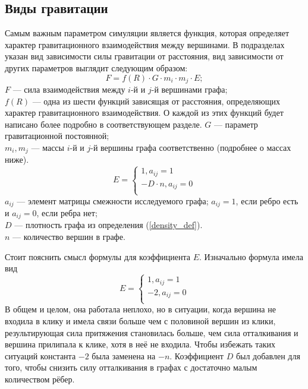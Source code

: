   \subsection{Виды гравитации}
    Самым важным параметром симуляции является функция, которая определяет
    характер гравитационного взаимодействия между вершинами.
    В подразделах указан вид зависимости силы гравитации от расстояния, вид
    зависимости от других параметров выглядит следующим образом:
    \begin{equation}
      F = f\left( R \right) \cdot  G \cdot m_i \cdot m_j \cdot E;
    \end{equation}
    $F$ --- сила взаимодействия между $i$-й и $j$-й вершинами графа;\\
    $f\left( R \right)$ --- одна из шести функций зависящая от расстояния,
    определяющих характер гравитационного взаимодействия. О каждой из этих функций
    будет написано более подробно в соответствующем разделе. 
    $G$ --- параметр гравитационной постоянной;\\
    $m_i, m_j$ --- массы $i$-й и $j$-й вершины графа соответственно (подробнее о
    массах ниже).\\
    \begin{equation}
      E =
      \begin{cases}
        1, a_{ij} = 1 \\
        - D \cdot n, a_{ij} = 0 \\
      \end{cases}
    \end{equation}
    $a_{ij}$ --- элемент матрицы смежности исследуемого графа;
    $a_{ij} = 1$, если ребро есть и $a_{ij} = 0$, если ребра нет;\\
    $D$ --- плотность графа из определения (\ref{density_def}).\\
    $n$ --- количество вершин в графе.

    Стоит пояснить смысл формулы для коэффициента $E$.
    Изначально формула имела вид
    \begin{equation}
      E =
      \begin{cases}
        1, a_{ij} = 1 \\
        - 2, a_{ij} = 0 \\
      \end{cases}
    \end{equation}
    В общем и целом, она работала неплохо, но в ситуации, когда вершина не входила
    в клику и имела связи больше чем с половиной вершин из клики, результирующая
    сила притяжения становилась больше, чем сила отталкивания и вершина прилипала
    к клике, хотя в неё не входила.
    Чтобы избежать таких ситуаций константа $-2$ была заменена на $-n$.
    Коэффициент $D$ был добавлен для того, чтобы снизить силу отталкивания в графах с
    достаточно малым количеством рёбер.

